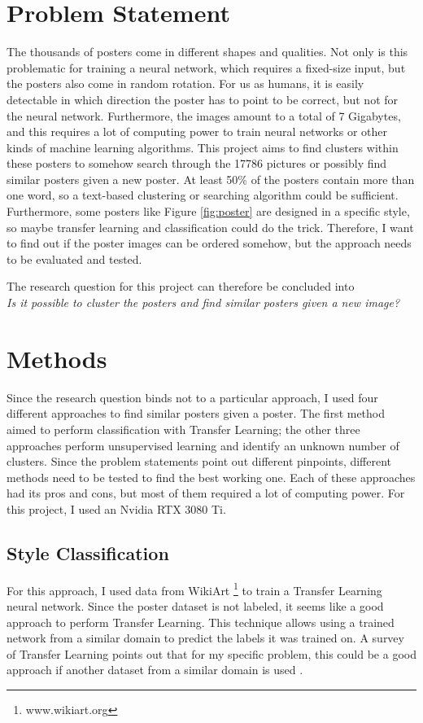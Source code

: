 \documentclass[conference]{IEEEtran}
\begin{document}
\section{Problem Statement}
The thousands of posters come in different shapes and qualities. Not only is this problematic for training a neural network, which requires a fixed-size input, but the posters also come in random rotation. For us as humans, it is easily detectable in which direction the poster has to point to be correct, but not for the neural network. Furthermore, the images amount to a total of 7 Gigabytes, and this requires a lot of computing power to train neural networks or other kinds of machine learning algorithms. This project aims to find clusters within these posters to somehow search through the 17786 pictures or possibly find similar posters given a new poster. At least 50\% of the posters contain more than one word, so a text-based clustering or searching algorithm could be sufficient. Furthermore, some posters like Figure \ref{fig:poster} are designed in a specific style, so maybe transfer learning and classification could do the trick. Therefore, I want to find out if the poster images can be ordered somehow, but the approach needs to be evaluated and tested. 

The research question for this project can therefore be concluded into \\

\textit{Is it possible to cluster the posters and find similar posters given a new image?}

\section{Methods}
Since the research question binds not to a particular approach, I used four different approaches to find similar posters given a poster. The first method aimed to perform classification with Transfer Learning; the other three approaches perform unsupervised learning and identify an unknown number of clusters. Since the problem statements point out different pinpoints, different methods need to be tested to find the best working one. Each of these approaches had its pros and cons, but most of them required a lot of computing power. For this project, I used an Nvidia RTX 3080 Ti. 


\subsection{Style Classification}
For this approach, I used data from WikiArt \footnote{www.wikiart.org} to train a Transfer Learning neural network. Since the poster dataset is not labeled, it seems like a good approach to perform Transfer Learning. This technique allows using a trained network from a similar domain to predict the labels it was trained on. A survey of Transfer Learning points out that for my specific problem, this could be a good approach if another dataset from a similar domain is used \cite{Zhuang.07.11.2019}.
\end{document}
